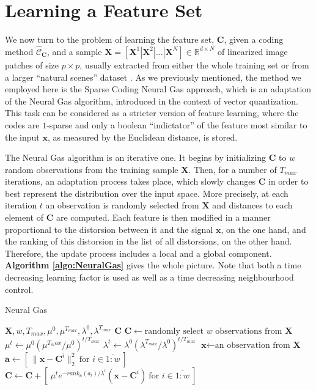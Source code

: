 \documentclass[runningheads,a4paper]{llncs}
\newcommand{\hctimes}[2]{{#1}\!\times\!{#2}}
\newcommand{\hcrange}[2]{\overline{{#1}\colon\!\!{#2}}}
\begin{document}
\section{Learning a Feature Set}

We now turn to the problem of learning the feature set, $\textbf{C}$, given a coding method $\hat{\mathcal{C}}_\textbf{C}$, and a sample $\textbf{X} = \left[ \textbf{X}^1 \left|\right. \textbf{X}^2 \left|\right. \dots \left|\right. \textbf{X}^N \right] \in \mathbb{R}^{\hctimes{d}{N}}$ of linearized image patches of size $\hctimes{p}{p}$, usually extracted from either the whole training set or from a larger ``natural scenes'' dataset \cite{self-taught-learning}. As we previously mentioned, the method we employed here is the Sparse Coding Neural Gas approach, which is an adaptation of the Neural Gas algorithm, introduced in the context of vector quantization. This task can be considered as a stricter version of feature learning, where the codes are $1$-sparse and only a boolean ``indictator'' of the feature most similar to the input $\textbf{x}$, as measured by the Euclidean distance, is stored.

The Neural Gas algorithm is an iterative one. It begins by initializing $\textbf{C}$ to $w$ random observations from the training sample $\textbf{X}$. Then, for a number of $T_{max}$ iterations, an adaptation process takes place, which slowly changes $\textbf{C}$ in order to best represent the distribution over the input space. More precisely, at each iteration $t$ an observation is randomly selected from $\textbf{X}$ and distances to each element of $\textbf{C}$ are computed. Each feature is then modified in a manner proportional to the distorsion between it and the signal $\textbf{x}$, on the one hand, and the ranking of this distorsion in the list of all distorsions, on the other hand. Therefore, the update process includes a local and a global component. \textbf{Algorithm \ref{algo:NeuralGas}} gives the whole picture. Note that both a time decreasing learning factor is used as well as a time decreasing neighbourhood control. 

\begin{algorithm}
\caption{Neural Gas}
\label{algo:NeuralGas}
\begin{algorithmic}
\Require $\textbf{X},w,T_{max},\mu^0,\mu^{T_{max}},\lambda^0,\lambda^{T_{max}}$
\Ensure $\textbf{C}$
\State $\textbf{C} \gets \mbox{randomly select $w$ observations from $\textbf{X}$}$
\For {$t = \hcrange{1}{T_{max}}$}
\State $\mu^t \gets \mu^0 (\mu^{T_max} / \mu^0)^{t / T_{max}}$ 
\State $\lambda^t \gets \lambda^0 (\lambda^{T_{max}} / \lambda^0)^{t / T_{max}}$ 
\State $\textbf{x} \gets \text{an observation from $\textbf{X}$}$
\State $\textbf{a} \gets [ ~ \|\textbf{x} - \textbf{C}^i\|_2^2 ~ \mbox{for $i \in \hcrange{1}{w}$} ~ ]$
\State $\textbf{C} \gets \textbf{C} + [ ~ \mu^t e^{-rank_{\textbf{a}}(a_i) / \lambda^t} (\textbf{x} - \textbf{C}^i) ~ \mbox{for $i \in \hcrange{1}{w}$} ~ ]$
\EndFor
\end{algorithmic}
\end{algorithm}
\end{document}
